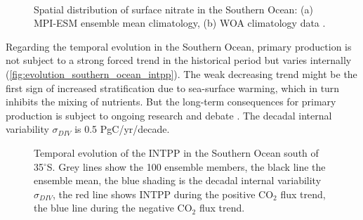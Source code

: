 \begin{figure}[bth]
        \myfloatalign
         \\
        \caption{Spatial distribution of surface nitrate in the Southern Ocean: (a) \acs{MPI-ESM} ensemble mean climatology, (b) \acf{WOA} climatology data \citep{WOA2013}.} \label{fig:SO_comp_nitrate}
\end{figure}

Regarding the temporal evolution in the Southern Ocean, primary production is not subject to a strong forced trend in the historical period but varies internally (\autoref{fig:evolution_southern_ocean_intpp}). The weak decreasing trend might be the first sign of increased stratification due to sea-surface warming, which in turn inhibits the mixing of nutrients. But the long-term consequences for primary production is subject to ongoing research and debate \citep{Bopp2013,Taucher2011,Lozier2011,Kessler2016,Krumhardt2017,Deppeler2017}. The decadal internal variability $\sigma_{DIV}$ is 0.5 PgC/yr/decade.

\begin{figure}[bth]
        \myfloatalign
	    \captionsetup[subfigure]{labelformat=empty,justification=centering}        
		\caption{Temporal evolution of the \acf{INTPP} in the Southern Ocean south of 35$^\circ$S. Grey lines show the 100 ensemble members, the black line the ensemble mean, the blue shading is the decadal internal variability $\sigma_{DIV}$, the red line shows \acs{INTPP} during the positive CO$_2$ flux trend, the blue line during the negative CO$_2$ flux trend.}	\label{fig:evolution_southern_ocean_intpp}
\end{figure}

